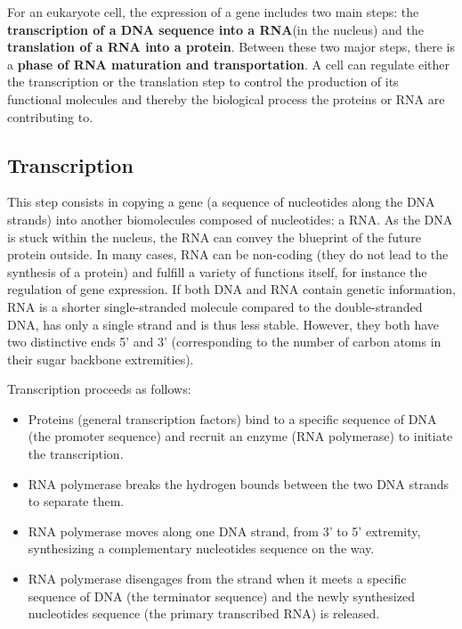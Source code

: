 For an eukaryote cell, the expression of a gene includes two main steps: the \textbf{transcription of a \ac{DNA} sequence into a \ac{RNA}}(in the nucleus) and the \textbf{translation of a \ac{RNA} into a protein}.
Between these two major steps, there is a \textbf{phase of \ac{RNA} maturation and transportation}.
A cell can regulate either the transcription or the translation step to control the production of its functional molecules and thereby the biological process the proteins or \ac{RNA} are contributing to.

\subsection{Transcription}
\label{subsec:intro_transcription}

This step consists in copying a gene (a sequence of nucleotides along the \ac{DNA} strands) into another biomolecules composed of nucleotides: a \ac{RNA}.
As the \ac{DNA} is stuck within the nucleus, the \ac{RNA} can convey the blueprint of the future protein outside.
In many cases, \ac{RNA} can be non-coding (they do not lead to the synthesis of a protein) and fulfill a variety of functions itself, for instance the regulation of gene expression.
If both \ac{DNA} and \ac{RNA} contain genetic information, \ac{RNA} is a shorter single-stranded molecule compared to the double-stranded \ac{DNA}, has only a single strand and is thus less stable.
However, they both have two distinctive ends 5' and 3' (corresponding to the number of carbon atoms in their sugar backbone extremities).

\noindent
Transcription proceeds as follows:
\begin{itemize}
	\item Proteins (general transcription factors) bind to a specific sequence of \ac{DNA} (the promoter sequence) and recruit an enzyme (\ac{RNA} polymerase) to initiate the transcription.
	\item \ac{RNA} polymerase breaks the hydrogen bounds between the two \ac{DNA} strands to separate them.
	\item \ac{RNA} polymerase moves along one \ac{DNA} strand, from 3' to 5' extremity, synthesizing a complementary nucleotides sequence on the way.
	\item \ac{RNA} polymerase disengages from the strand when it meets a specific sequence of \ac{DNA} (the terminator sequence) and the newly synthesized nucleotides sequence (the primary transcribed \ac{RNA}) is released.
\end{itemize}

